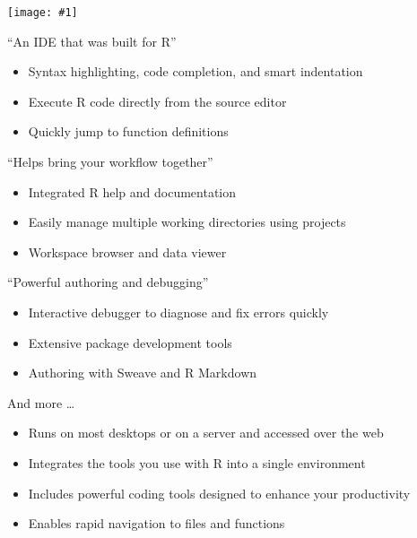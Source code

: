 \documentclass[
  11pt,
  ignorenonframetext,
  aspectratio=169]{beamer}
\providecommand{\tightlist}{%
  \setlength{\itemsep}{0pt}\setlength{\parskip}{0pt}}
\newcommand{\fullframegraphic}[1]{
  \texttt{[image: \#1]}
}
\newlength\beamerleftmargin
\begin{document}
\begin{frame}{}
\protect\hypertarget{section-3}{}
\vspace*{-10.6mm}\hspace*{-\beamerleftmargin}\hspace*{-1.5mm}
\fullframegraphic{"../captures/Capture d’écran (2)"}
\end{frame}

\begin{frame}{``An IDE that was built for R''}
\protect\hypertarget{an-ide-that-was-built-for-r}{}
\begin{itemize}
\tightlist
\item
  Syntax highlighting, code completion, and smart indentation
\item
  Execute R code directly from the source editor
\item
  Quickly jump to function definitions
\end{itemize}
\end{frame}

\begin{frame}{``Helps bring your workflow together''}
\protect\hypertarget{helps-bring-your-workflow-together}{}
\begin{itemize}
\tightlist
\item
  Integrated R help and documentation
\item
  Easily manage multiple working directories using projects
\item
  Workspace browser and data viewer
\end{itemize}
\end{frame}

\begin{frame}{``Powerful authoring and debugging''}
\protect\hypertarget{powerful-authoring-and-debugging}{}
\begin{itemize}
\tightlist
\item
  Interactive debugger to diagnose and fix errors quickly
\item
  Extensive package development tools
\item
  Authoring with Sweave and R Markdown
\end{itemize}
\end{frame}

\begin{frame}{And more \ldots{}}
\protect\hypertarget{and-more}{}
\begin{itemize}
\tightlist
\item
  Runs on most desktops or on a server and accessed over the web
\item
  Integrates the tools you use with R into a single environment
\item
  Includes powerful coding tools designed to enhance your productivity
\item
  Enables rapid navigation to files and functions
\end{itemize}
\end{frame}
\end{document}
